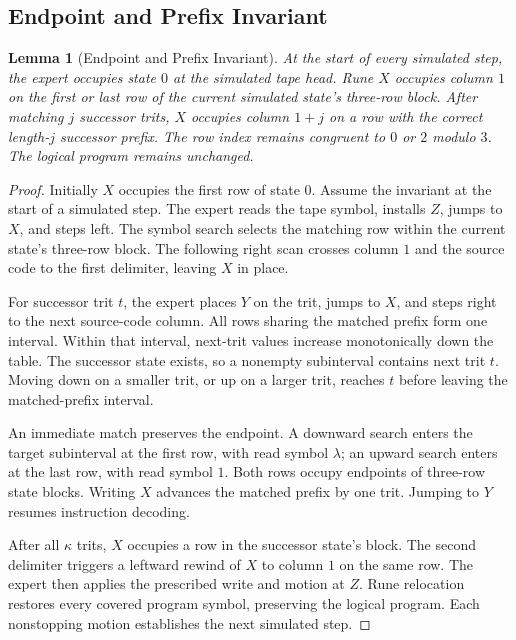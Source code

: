 \documentclass[11pt,a4paper]{article}
\newcommand{\blank}{\lambda}
\newtheorem{lemma}{Lemma}
\begin{document}
\subsection{Endpoint and Prefix Invariant}\label{sec:part2}
\begin{lemma}[Endpoint and Prefix Invariant]\label{lem:geometry}
At the start of every simulated step, the expert occupies state $0$ at the
simulated tape head. Rune $X$ occupies column $1$ on the first or last row
of the current simulated state's three-row block. After matching $j$
successor trits, $X$ occupies column $1+j$ on a row with the correct
length-$j$ successor prefix. The row index remains congruent to $0$ or $2$
modulo $3$. The logical program remains unchanged.
\end{lemma}
\begin{proof}
Initially $X$ occupies the first row of state $0$. Assume the invariant at
the start of a simulated step. The expert reads the tape symbol, installs
$Z$, jumps to $X$, and steps left. The symbol search selects the matching
row within the current state's three-row block. The following right scan
crosses column $1$ and the source code to the first delimiter, leaving $X$
in place.

For successor trit $t$, the expert places $Y$ on the trit, jumps to $X$, and
steps right to the next source-code column. All rows sharing the matched
prefix form one interval. Within that interval, next-trit values increase
monotonically down the table. The successor state exists, so a nonempty
subinterval contains next trit $t$. Moving down on a smaller trit, or up
on a larger trit, reaches $t$ before leaving the matched-prefix interval.

An immediate match preserves the endpoint. A downward search enters the
target subinterval at the first row, with read symbol $\blank$; an upward
search enters at the last row, with read symbol $1$. Both rows occupy
endpoints of three-row state blocks. Writing $X$ advances the matched
prefix by one trit. Jumping to $Y$ resumes instruction decoding.

After all $\kappa$ trits, $X$ occupies a row in the successor state's block.
The second delimiter triggers a leftward rewind of $X$ to column $1$ on
the same row. The expert then applies the prescribed write and motion at
$Z$. Rune relocation restores every covered program symbol, preserving
the logical program. Each nonstopping motion establishes the next simulated step.
\end{proof}
\end{document}
